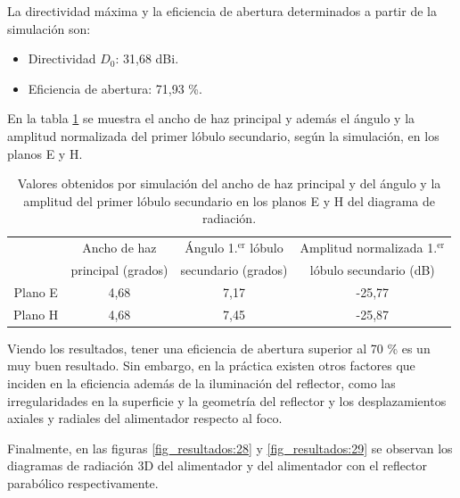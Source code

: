 La directividad máxima y la eficiencia de abertura determinados a partir de la simulación son:
\begin{itemize}
\item Directividad $D_0$: 31,68 dBi.
\item Eficiencia de abertura: 71,93 \%.
\end{itemize}
En la tabla \ref{tabla_mediciones:4} se muestra el ancho de haz principal y además el ángulo y la amplitud normalizada del primer lóbulo secundario, según la simulación, en los planos E y H.
\begin{table}[H]
\centering
\begin{tabular}{c|c|c|c|}
\cline{2-4}
& Ancho de haz & Ángulo 1.$^{\text{er}}$ lóbulo & Amplitud normalizada 1.$^{\text{er}}$ \\
& principal (grados) & secundario (grados) & lóbulo secundario (dB) \\
\hline
\multicolumn{1}{|c|}{Plano E} & 4,68 & 7,17 & -25,77 \\
\hline
\multicolumn{1}{|c|}{Plano H} & 4,68 & 7,45 & -25,87 \\
\hline
\end{tabular}
\caption{Valores obtenidos por simulación del ancho de haz principal y del ángulo y la amplitud del primer lóbulo secundario en los planos E y H del diagrama de radiación.}
\label{tabla_mediciones:4}
\end{table}
Viendo los resultados, tener una eficiencia de abertura superior al 70 \% es un muy buen resultado. Sin embargo, en la práctica existen otros factores que inciden en la eficiencia además de la iluminación del reflector, como las irregularidades en la superficie y la geometría del reflector y los desplazamientos axiales y radiales del alimentador respecto al foco.

Finalmente, en las figuras \ref{fig_resultados:28} y \ref{fig_resultados:29} se observan los diagramas de radiación 3D del alimentador y del alimentador con el reflector parabólico respectivamente.

